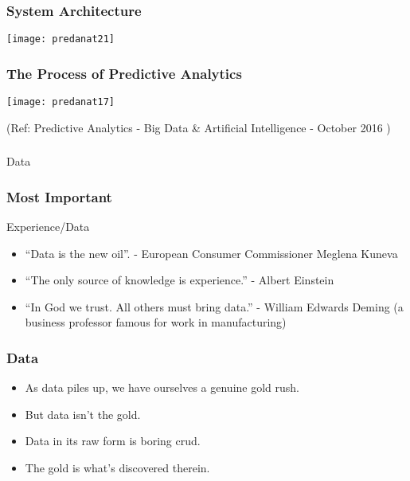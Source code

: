\begin{frame}\frametitle{System Architecture}

\begin{center}
\texttt{[image: predanat21]}
\end{center}


\end{frame}



\begin{frame}\frametitle{The	Process of Predictive Analytics}

\begin{center}
\texttt{[image: predanat17]}
\end{center}

{\tiny (Ref: Predictive Analytics - Big	Data	\&	Artificial	Intelligence - October 2016 )}

\end{frame}


\begin{frame}[fragile]\frametitle{}
\begin{center}
{\Large Data}
\end{center}
\end{frame}

\begin{frame}\frametitle{Most Important}
Experience/Data
\begin{itemize}
\item ``Data is the new oil''. - European Consumer Commissioner Meglena Kuneva
\item ``The only source of knowledge is experience.'' - Albert Einstein
\item ``In God we trust. All others must bring data.'' - William Edwards Deming (a business professor famous for work in manufacturing)
\end{itemize}

\end{frame}

\begin{frame}\frametitle{Data}
\begin{itemize}
\item As data piles up, we have ourselves a genuine gold rush. 
\item But data isn't the gold. 
\item Data in its raw form is boring crud. 
\item The gold is what's discovered therein.
\end{itemize}

\end{frame}

